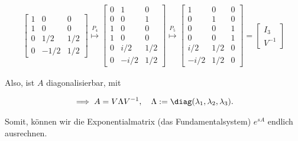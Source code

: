 \begin{solution}
\begin{multline*}
\begin{bmatrix}
        1 &  0 & 0 \\
        \hline
        1 &  0   & 0 \\
        0 &  1/2 & 1/2 \\
        0 & -1/2 & 1/2
    \end{bmatrix}
    \stackrel{P_4}{\mapsto}
    \begin{bmatrix}
        0 & 1 & 0 \\
        0 & 0 & 1 \\
        1 & 0 & 0 \\
        \hline
        1 &  0   & 0 \\
        0 &  i/2 & 1/2 \\
        0 & -i/2 & 1/2
    \end{bmatrix}
    \stackrel{P_5}{\mapsto}
    \begin{bmatrix}
        1 & 0 & 0 \\
        0 & 1 & 0 \\
        0 & 0 & 1 \\
        \hline
         0   & 0   & 1 \\
         i/2 & 1/2 & 0 \\
        -i/2 & 1/2 & 0
    \end{bmatrix}
    =
    \begin{bmatrix}
        I_3 \\
        \hline
        V^{-1}
    \end{bmatrix}
\end{multline*}

Also, ist $A$ diagonalisierbar, mit

\begin{align*}
    \implies
    A = V \Lambda V^{-1},
    \quad
    \Lambda := \diag(\lambda_1, \lambda_2, \lambda_3).
\end{align*}

Somit, können wir die Exponentialmatrix (das Fundamentalsystem) $e^{sA}$ endlich ausrechnen.


\end{solution}
